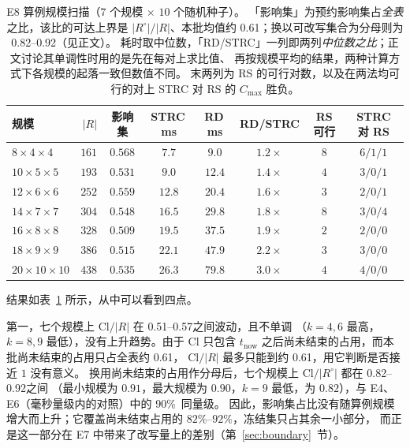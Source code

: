 \documentclass[manuscript,screen,review]{acmart}
\providecommand{\STRC}{\textsc{STRC}}
\newcommand{\NSeeds}{10}
\newcommand{\ClosureAliveFrac}{90\%}
\newcommand{\ScaleKs}{7}
\newcommand{\ScaleCloLo}{0.51}  %
\newcommand{\ScaleCloHi}{0.57}  %
\newcommand{\ScaleAliveShare}{0.61}  %
\newcommand{\ScaleCloAliveLo}{0.82}  %
\newcommand{\ScaleCloAliveHi}{0.92}  %
\begin{document}
\begin{table}[t]
\centering
\caption{E8 算例规模扫描（\(\ScaleKs\) 个规模 \(\times\) \(\NSeeds\) 个随机种子）。
「影响集」为预约影响集占\emph{全表}之比，该比的可达上界是 \(|R^{\circ}|/|R|\)、本批均值约
\ScaleAliveShare；换以可改写集合为分母则为 \ScaleCloAliveLo--\ScaleCloAliveHi（见正文）。
耗时取中位数，「RD/\STRC{}」一列即两列\emph{中位数之比}；正文讨论其单调性时用的是先在每对上求比值、
再按规模平均的结果，两种计算方式下各规模的起落一致但数值不同。
末两列为 RS 的可行对数，以及在两法均可行的对上 \STRC{} 对 RS 的 \(C_{\max}\) 胜负。}
\label{tab:instscale}
\small
\begin{tabular}{@{}lrcccccc@{}}
\toprule
规模 & \(|R|\) & 影响集 & \STRC{}\,ms & RD\,ms & RD/\STRC{} & RS 可行 & \STRC{} 对 RS \\
\midrule
\(8\times4\times4\)    & \(161\) & \(0.568\) & \(7.7\)  & \(9.0\)  & \(1.2\times\) & \(8\) & \(6/1/1\) \\
\(10\times5\times5\)   & \(193\) & \(0.531\) & \(9.0\)  & \(12.4\) & \(1.4\times\) & \(4\) & \(3/0/1\) \\
\(12\times6\times6\)   & \(252\) & \(0.559\) & \(12.8\) & \(20.4\) & \(1.6\times\) & \(3\) & \(2/0/1\) \\
\(14\times7\times7\)   & \(304\) & \(0.548\) & \(16.5\) & \(29.8\) & \(1.8\times\) & \(8\) & \(3/0/4\) \\
\(16\times8\times8\)   & \(328\) & \(0.509\) & \(19.5\) & \(37.5\) & \(1.9\times\) & \(2\) & \(2/0/0\) \\
\(18\times9\times9\)   & \(386\) & \(0.515\) & \(22.1\) & \(47.9\) & \(2.2\times\) & \(3\) & \(3/0/0\) \\
\(20\times10\times10\) & \(438\) & \(0.535\) & \(26.3\) & \(79.8\) & \(3.0\times\) & \(4\) & \(4/0/0\) \\
\bottomrule
\end{tabular}
\end{table}

结果如表~\ref{tab:instscale} 所示，从中可以看到四点。

第一，七个规模上 \(\mathrm{Cl}/|R|\) 在 \ScaleCloLo--\ScaleCloHi 之间波动，且不单调
（\(k=4,6\) 最高，\(k=8,9\) 最低），没有上升趋势。由于 \(\mathrm{Cl}\) 只包含
\(t_{\mathrm{now}}\) 之后尚未结束的占用，而本批尚未结束的占用只占全表约 \ScaleAliveShare，
\(\mathrm{Cl}/|R|\) 最多只能到约 \ScaleAliveShare，用它判断是否接近 \(1\) 没有意义。
换用尚未结束的占用作分母后，七个规模上 \(\mathrm{Cl}/|R^{\circ}|\) 都在 \ScaleCloAliveLo--\ScaleCloAliveHi 之间
（最小规模为 \(0.91\)，最大规模为 \(0.90\)，\(k=9\) 最低，为 \(0.82\)），与 E4、E6（毫秒量级内的对照）中的 \ClosureAliveFrac\ 同量级。
因此，影响集占比没有随算例规模增大而上升；它覆盖尚未结束占用的 \(82\%\)--\(92\%\)，冻结集只占其余一小部分，
而正是这一部分在 E7 中带来了改写量上的差别（第~\ref{sec:boundary}~节）。
\end{document}
